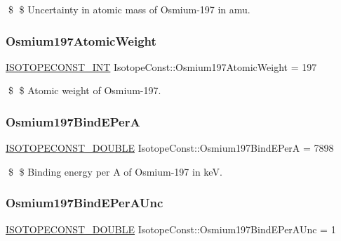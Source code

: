 \$ \$ Uncertainty in atomic mass of Osmium-\/197 in amu. \mbox{\label{group___isotope_const-_osmium-_os197_ga78cd9b36d1f8343f8c96348981f68de3}} 
\subsubsection{\texorpdfstring{Osmium197\+Atomic\+Weight}{Osmium197AtomicWeight}}
{\footnotesize\ttfamily \mbox{\hyperlink{group___isotope_const-_macros_ga5f18360b3e99483a35c32d789e62621c}{I\+S\+O\+T\+O\+P\+E\+C\+O\+N\+S\+T\+\_\+\+I\+NT}} Isotope\+Const\+::\+Osmium197\+Atomic\+Weight = 197}

\$ \$ Atomic weight of Osmium-\/197. \mbox{\label{group___isotope_const-_osmium-_os197_gaa8b53211ff8d8b06ae97dc21274fe7f3}} 
\subsubsection{\texorpdfstring{Osmium197\+Bind\+E\+PerA}{Osmium197BindEPerA}}
{\footnotesize\ttfamily \mbox{\hyperlink{group___isotope_const-_macros_ga8f45a7272ce02c0b4c65c44636ed719a}{I\+S\+O\+T\+O\+P\+E\+C\+O\+N\+S\+T\+\_\+\+D\+O\+U\+B\+LE}} Isotope\+Const\+::\+Osmium197\+Bind\+E\+PerA = 7898}

\$ \$ Binding energy per A of Osmium-\/197 in keV. \mbox{\label{group___isotope_const-_osmium-_os197_ga59d4374d4c52e8a5a8008a68ed5dde55}} 
\subsubsection{\texorpdfstring{Osmium197\+Bind\+E\+Per\+A\+Unc}{Osmium197BindEPerAUnc}}
{\footnotesize\ttfamily \mbox{\hyperlink{group___isotope_const-_macros_ga8f45a7272ce02c0b4c65c44636ed719a}{I\+S\+O\+T\+O\+P\+E\+C\+O\+N\+S\+T\+\_\+\+D\+O\+U\+B\+LE}} Isotope\+Const\+::\+Osmium197\+Bind\+E\+Per\+A\+Unc = 1}

